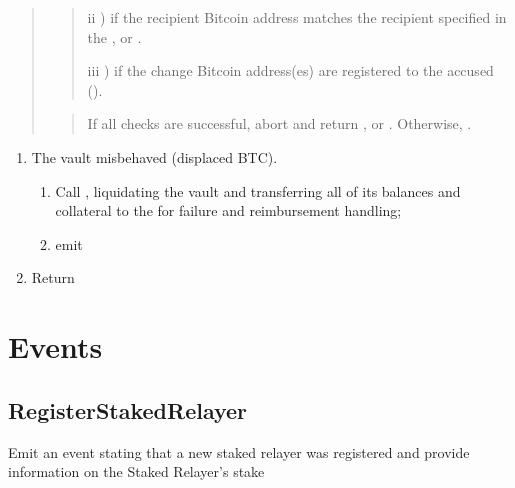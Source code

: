\documentclass[a4paper,10pt,english]{sphinxmanual}
\begin{document}
\begin{quote}
\begin{enumerate}
\begin{quote}
ii ) if the recipient Bitcoin address matches the recipient specified in the ,  or .

iii ) if the change Bitcoin address(es) are registered to the accused  ().
\end{quote}

\end{enumerate}
\begin{quote}

If all checks are successful, abort and return ,  or . Otherwise, .
\end{quote}
\end{quote}
\begin{enumerate}
%
\setcounter{enumi}{7}
\item {} 
The vault misbehaved (displaced BTC).
\begin{enumerate}
%
\item {} 
Call {\hyperref[\detokenize{spec/vault-registry:liquidatevault}]{}}, liquidating the vault and transferring all of its balances and collateral to the  for failure and reimbursement handling;

\item {} 
emit 

\end{enumerate}

\item {} 
Return

\end{enumerate}


\section{Events}
\label{\detokenize{spec/staked-relayers:events}}

\subsection{RegisterStakedRelayer}
\label{\detokenize{spec/staked-relayers:id13}}
Emit an event stating that a new staked relayer was registered and provide information on the Staked Relayer’s stake
\end{document}
